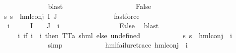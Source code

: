 \begin{isabellebody}
\ \ \ \ \ \ \ \ \ \ \ \ \isamarkupfalse%
\ blast\isanewline
\ \ \ \ \ \ \ \ \isamarkupfalse%
\isanewline
\ \ \ \ \ \ \ \ \ \ \isamarkupfalse%
\ False\isanewline
\ \ \ \ \ \ \ \ \ \ \isamarkupfalse%
\ {\isachardoublequoteopen}{\isasymforall}s{\isachardot}{\kern0pt}\ {\isasymnot}{\isacharparenleft}{\kern0pt}s\ {\isasymTurnstile}\ hml{\isacharunderscore}{\kern0pt}conj\ I\ J\ {\isasymPhi}{\isacharparenright}{\kern0pt}{\isachardoublequoteclose}\ \isanewline
\ \ \ \ \ \ \ \ \ \ \ \ \isamarkupfalse%
\ fastforce\isanewline
\ \ \ \ \ \ \ \ \ \ \isamarkupfalse%
\ \isamarkupfalse%
\ {\isasymphi}\ i{\isacharunderscore}{\kern0pt}{\isasymphi}\ \ {\isachardoublequoteopen}{\isasymphi}\ {\isasymin}\ {\isasymPhi}\ {\isacharbackquote}{\kern0pt}\ I\ {\isasyminter}\ {\isasymPhi}\ {\isacharbackquote}{\kern0pt}\ J{\isachardoublequoteclose}\ {\isachardoublequoteopen}{\isasymPhi}\ i{\isacharunderscore}{\kern0pt}{\isasymphi}\ {\isacharequal}{\kern0pt}\ {\isasymphi}{\isachardoublequoteclose}\ \isanewline
\ \ \ \ \ \ \ \ \ \ \ \ \isamarkupfalse%
\ False\ \isamarkupfalse%
\ blast\isanewline
\ \ \ \ \ \ \ \ \ \ \isamarkupfalse%
\ {\isasymPsi}\ \ {\isachardoublequoteopen}{\isasymPsi}\ {\isasymequiv}\ {\isacharparenleft}{\kern0pt}{\isasymlambda}i{\isachardot}{\kern0pt}\ {\isacharparenleft}{\kern0pt}if\ i\ {\isacharequal}{\kern0pt}\ i{\isacharunderscore}{\kern0pt}{\isasymphi}\ then\ TT{\isacharcolon}{\kern0pt}{\isacharcolon}{\kern0pt}{\isacharparenleft}{\kern0pt}{\isacharprime}{\kern0pt}a{\isacharcomma}{\kern0pt}\ {\isacharprime}{\kern0pt}s{\isacharparenright}{\kern0pt}hml\ else\ undefined{\isacharparenright}{\kern0pt}{\isacharparenright}{\kern0pt}{\isachardoublequoteclose}\isanewline
\ \ \ \ \ \ \ \ \ \ \isamarkupfalse%
\ {\isachardoublequoteopen}{\isasymforall}s{\isachardot}{\kern0pt}\ {\isasymnot}{\isacharparenleft}{\kern0pt}s\ {\isasymTurnstile}\ hml{\isacharunderscore}{\kern0pt}conj\ {\isacharbraceleft}{\kern0pt}{\isacharbraceright}{\kern0pt}\ {\isacharbraceleft}{\kern0pt}i{\isacharunderscore}{\kern0pt}{\isasymphi}{\isacharbraceright}{\kern0pt}\ {\isasymPsi}{\isacharparenright}{\kern0pt}{\isachardoublequoteclose}\ \isanewline
\ \ \ \ \ \ \ \ \ \ \ \ \isamarkupfalse%
\ simp\isanewline
\ \ \ \ \ \ \ \ \ \ \isamarkupfalse%
\ {\isachardoublequoteopen}hml{\isacharunderscore}{\kern0pt}failure{\isacharunderscore}{\kern0pt}trace\ {\isacharparenleft}{\kern0pt}hml{\isacharunderscore}{\kern0pt}conj\ {\isacharbraceleft}{\kern0pt}{\isacharbraceright}{\kern0pt}\ {\isacharbraceleft}{\kern0pt}i{\isacharunderscore}{\kern0pt}{\isasymphi}{\isacharbraceright}{\kern0pt}\ {\isasymPsi}{\isacharparenright}{\kern0pt}{\isachardoublequoteclose}\ \isanewline

\end{isabellebody}
